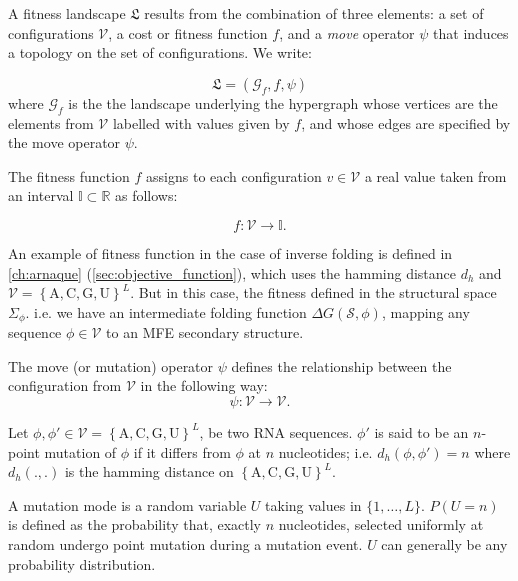 \begin{mydef}
	\label{def:fitness_landscape}
	A fitness landscape $\mathfrak{L}$ results from the combination of three elements: a set of configurations $\mathcal{V}$, a cost or fitness function $f$, and a \textit{move} operator $\psi$ that induces a topology on the set of configurations. We write: 
	
	\begin{equation}
	\mathfrak{L} = (\mathcal{G}_f, f, \psi)
	\end{equation}
where $\mathcal{G}_f$  is the the landscape underlying the hypergraph whose vertices are the elements from $\mathcal{V}$ labelled with values given by $f$, and whose edges are specified by the move operator $\psi$.
	
The fitness function $f$ assigns to each configuration $v\in \mathcal{V}$ a real value taken from an interval $ \mathbb{I} \subset \mathbb{R}$ as follows: 

$$
f: \mathcal{V} \rightarrow \mathbb{I}.
$$

An example of fitness function in the case of inverse folding is defined in  \autoref{ch:arnaque} (\autoref{sec:objective_function}), which uses the hamming distance $d_h$ and $\mathcal{V}=\left\{ \text{A}, \text{C}, \text{G}, \text{U} \right\}^L$. But in this case, the fitness defined in the structural space $\Sigma_{\phi}$. i.e. we have an intermediate folding function $\Delta G (\mathcal{S}, \phi)$, mapping any sequence $\phi \in \mathcal{V}$ to an \ac{MFE} secondary structure. 

The move (or mutation) operator $\psi$ defines the relationship between the configuration from  $\mathcal{V}$ in the following way: 
$$
\psi \colon \mathcal{V} \rightarrow \mathcal{V}.
$$
\end{mydef}

\begin{mydef}
	\label{def:mutation_mode}
	
	Let $\phi, \phi' \in \mathcal{V} = \left\{ \text{A}, \text{C}, \text{G}, \text{U} \right\}^L$, be  two \ac{RNA} sequences. $\phi'$ is said to be an $n$-point mutation of $\phi$ if it differs from $\phi$ at $n$ nucleotides; i.e. $d_h(\phi, \phi')=n$ where $d_h(.,.)$ is the hamming distance on $\left\{ \text{A}, \text{C}, \text{G}, \text{U} \right\}^L$. 
	
	A mutation mode is a random variable $U$ taking values in $\{1,\dots,L\}$. $P(U=n)$ is defined as the probability that, exactly $n$ nucleotides, selected uniformly at random undergo point mutation during a mutation event. $U$ can generally be any probability distribution.
	
\end{mydef}

